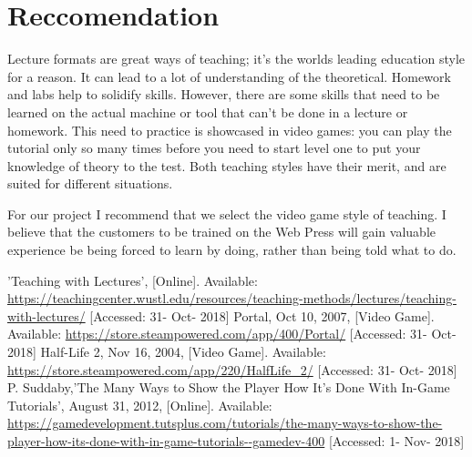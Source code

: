 \documentclass[onecolumn, draftclsnofoot,10pt, compsoc]{IEEEtran}
\begin{document}
\section*{Reccomendation}
Lecture formats are great ways of teaching; it's the worlds leading education style for a reason. It can lead to a lot of understanding of the theoretical. Homework and labs help to solidify skills. However, there are some skills that need to be learned on the actual machine or tool that can't be done in a lecture or homework. This need to practice is showcased in video games: you can play the tutorial only so many times before you need to start level one to put your knowledge of theory to the test. Both teaching styles have their merit, and are suited for different situations.

For our project I recommend that we select the video game style of teaching. I believe that the customers to be trained on the Web Press will gain valuable experience be being forced to learn by doing, rather than being told what to do.


\begin{thebibliography}{00}
 'Teaching with Lectures', [Online]. Available: \url{https://teachingcenter.wustl.edu/resources/teaching-methods/lectures/teaching-with-lectures/} [Accessed: 31- Oct- 2018]
 Portal, Oct 10, 2007, [Video Game]. Available: \url{https://store.steampowered.com/app/400/Portal/} [Accessed: 31- Oct- 2018]
 Half-Life 2, Nov 16, 2004, [Video Game]. Available: \url{https://store.steampowered.com/app/220/HalfLife\_2/} [Accessed: 31- Oct- 2018]
 P. Suddaby,'The Many Ways to Show the Player How It's Done With In-Game Tutorials', August 31, 2012, [Online]. Available: \url{https://gamedevelopment.tutsplus.com/tutorials/the-many-ways-to-show-the-player-how-its-done-with-in-game-tutorials--gamedev-400} [Accessed: 1- Nov- 2018]


\end{thebibliography}
\end{document}
